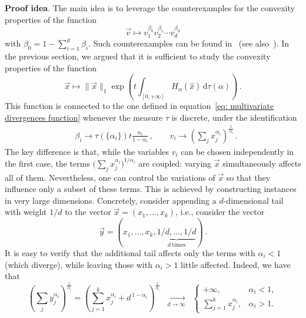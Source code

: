 \documentclass[aps,pra,11pt,onecolumn,nofootinbib,tightenlines]{revtex4-2}
\theoremstyle{definition}
\def \d {\mathrm{d}}
\begin{document}
\bigskip 
\textbf{Proof idea}. The main idea is to leverage the counterexamples for the convexity properties of the function
\begin{equation}
\label{eq: multivariate divergences function}
    \vec{v} \longmapsto v_1^{\beta_0} v_2^{\beta_1} \cdots v_d^{\beta_d} 
\end{equation}
with $\beta_0=1-\sum_{i=1}^d\beta_i$. Such counterexamples can be found in~\cite[Lemma 8]{mu21_renyi} (see also~\cite[Proposition 13]{farooq2024matrix}). In the previous section, we argued that it is sufficient to study the convexity properties of the function
\begin{equation}
    \vec{x} \longmapsto \|\vec{x}\|_1 \exp\left( t\int_{[0,+\infty]} H_\alpha(\hat{x}) \,\d\tau(\alpha) \right)\,.
\end{equation}
This function is connected to the one defined in equation~\ref{eq: multivariate divergences function} whenever the measure $\tau$ is discrete, under the identification
\begin{align}
    &\beta_i \rightarrow \tau(\{\alpha_i\})  t\frac{\alpha_i}{1-\alpha_i} \,, \qquad  v_i \rightarrow\left(\sum_j x_j^{\alpha_i}\right)^\frac{1}{\alpha_i} \,.
\end{align}
The key difference is that, while the variables $v_i$ can be chosen independently in the first case, the terms $\bigl(\sum_j x_j^{\alpha_i}\bigr)^{1/\alpha_i}$ are coupled: varying $\vec{x}$ simultaneously affects all of them. Nevertheless, one can control the variations of $\vec{x}$ so that they influence only a subset of these terms. This is achieved by constructing instances in very large dimensions. Concretely, consider appending a $d$-dimensional tail with weight $1/d$ to the vector $\vec{x}=(x_1,\ldots,x_k)$, i.e., consider the vector
\begin{equation}
   \vec{y} = (x_1,\ldots,x_k, 
   \underbrace{1/d, \ldots, 1/d}_{d\ \text{times}} ) \,.
\end{equation}
It is easy to verify that the additional tail affects only the terms with $\alpha_i<1$ (which diverge), while leaving those with $\alpha_i>1$ little affected. Indeed, we have that
\begin{equation}
    \left(\sum_j y_j^{\alpha_i}\right)^{\tfrac{1}{\alpha_i}} 
= \left(\sum_{j=1}^k x_j^{\alpha_i} + d^{\,1-\alpha_i}\right)^{\tfrac{1}{\alpha_i}}
\;\;\xrightarrow[d \to \infty]{}\;\;
\begin{cases}
+\infty, & \alpha_i < 1, \\[6pt]
\sum_{j=1}^k x_j^{\alpha_i}, & \alpha_i > 1.
\end{cases}
\end{equation}
\end{document}
